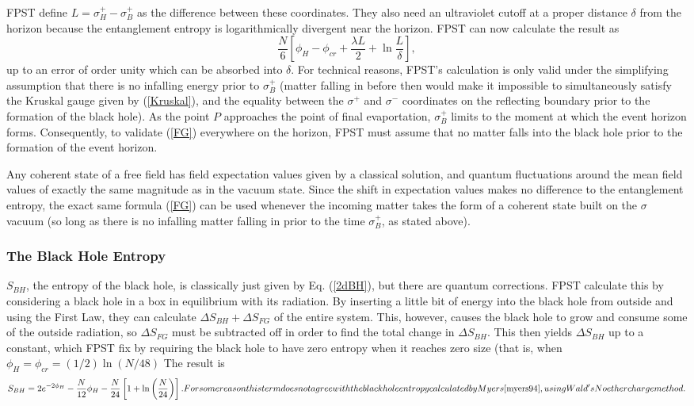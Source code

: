 \documentclass{article}
\begin{document}
FPST define $L = \sigma^{+}_H - \sigma^{+}_B$ as the difference between these coordinates.  They also need an ultraviolet cutoff at a proper distance $\delta$ from the horizon because the entanglement entropy is logarithmically divergent near the horizon.  FPST can now calculate the result as
\begin{equation}\label{FG}
\frac{N}{6} \left[ \phi_{H} - \phi_{cr} + \frac{\lambda L}{2} + \ln \frac {L}{\delta} \right],
\end{equation}
up to an error of order unity which can be absorbed into $\delta$.  For technical reasons, FPST's calculation is only valid under the simplifying assumption that there is no infalling energy prior to $\sigma^{+}_B$ (matter falling in before then would make it impossible to simultaneously satisfy the Kruskal gauge given by (\ref{Kruskal}), and the equality between the $\sigma^{+}$ and $\sigma^{-}$ coordinates on the reflecting boundary prior to the formation of the black hole).  As the point $P$ approaches the point of final evaportation, $\sigma^{+}_B$ limits to the moment at which the event horizon forms.  Consequently, to validate (\ref{FG}) everywhere on the horizon, FPST must assume that no matter falls into the black hole prior to the formation of the event horizon.

Any coherent state of a free field has field expectation values given by a classical solution, and quantum fluctuations around the mean field values of exactly the same magnitude as in the vacuum state.  Since the shift in expectation values makes no difference to the entanglement entropy, the exact same formula (\ref{FG}) can be used whenever the incoming matter takes the form of a coherent state built on the $\sigma$ vacuum (so long as there is no infalling matter falling in prior to the time $\sigma^{+}_B$, as stated above).

\subsubsection{The Black Hole Entropy}

$S_{BH}$, the entropy of the black hole, is classically just given by Eq. (\ref{2dBH}), but there are quantum corrections.  FPST calculate this by considering a black hole in a box in equilibrium with its radiation.  By inserting a little bit of energy into the black hole from outside and using the First Law, they can calculate $\Delta S_{BH} + \Delta S_{FG}$ of the entire system.  This, however, causes the black hole to grow and consume some of the outside radiation, so $\Delta S_{FG}$ must be subtracted off in order to find the total change in $\Delta S_{BH}$.  This then yields $\Delta S_{BH}$ up to a constant, which FPST fix by requiring the black hole to have zero entropy when it reaches zero size (that is, when $\phi_{H} = \phi_{cr} = (1/2)\ln (N/48)$  The result is
\begin{equation}\label{BH}
S_{BH} = 2e^{-2\phi_H} - \frac{N}{12}\phi_H - 
\frac{N}{24}\left[ 1 + \ln \left( \frac{N}{24} \right) \right].\footnote{For some reason this term does not agree with the black hole entropy calculated by Myers \cite{myers94}, using Wald's Noether charge method.}
\end{equation}
\end{document}
